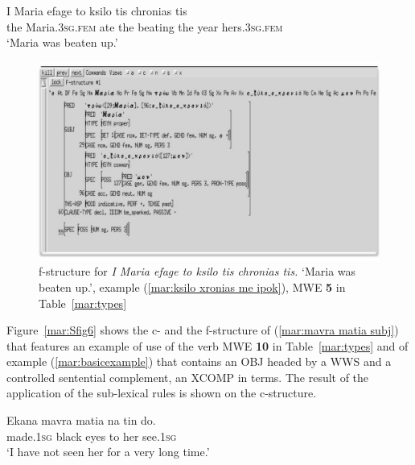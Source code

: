\documentclass[output=paper]{langsci/langscibook}
\begin{document}
 \ea\label{mar:ksilo xronias me ipok}
\gll	I Maria     efage to   ksilo      tis          chronias    tis \\
the Maria.\textsc{3sg}.\textsc{fem} ate the beating the year hers.\textsc{3sg}.\textsc{fem} \\
\glt `Maria was beaten up.’
\z

\begin{figure}[h!]
 \caption{\label{mar:Sfig5}f-structure for \textit{I Maria efage to ksilo tis chronias tis.} `Maria was beaten up.', example (\ref{mar:ksilo xronias me ipok}), MWE \textbf{5} in Table~\ref{mar:types}}
 \centering
 \includegraphics[width=1\textwidth]{figures/example9a}
 \end{figure}


Figure~\ref{mar:Sfig6} shows the c- and the f-structure of (\ref{mar:mavra matia subj}) that features an example of use of the verb MWE \textbf{10} in Table~\ref{mar:types} and of example (\ref{mar:basicexample}) that  contains an OBJ  headed by a WWS and a controlled sentential complement, an XCOMP in  terms. The result of the application of the sub-lexical rules is shown on the c-structure. 

 \ea\label{mar:mavra matia subj}
\gll Ekana           mavra    matia    na  tin   do.\\ 
made.\textsc{1sg}   black      eyes      to  her see.\textsc{1sg}\\
\glt `I have not seen her for a very long time.’
\z
 
\end{document}
